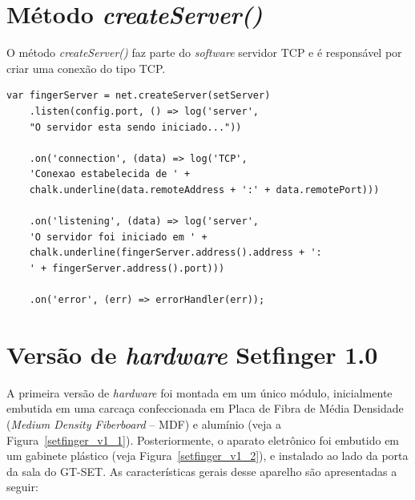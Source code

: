 \chapter{Método \textit{createServer()} \label{apendice_createserver}}
O método \textit{createServer()} faz parte do \textit{software} servidor TCP e é responsável por criar uma conexão do tipo TCP.

\begin{lstlisting}
var fingerServer = net.createServer(setServer)
    .listen(config.port, () => log('server', 
    "O servidor esta sendo iniciado..."))
    
    .on('connection', (data) => log('TCP', 
    'Conexao estabelecida de ' +
    chalk.underline(data.remoteAddress + ':' + data.remotePort)))
    
    .on('listening', (data) => log('server', 
    'O servidor foi iniciado em ' + 
    chalk.underline(fingerServer.address().address + ':
    ' + fingerServer.address().port)))
    
    .on('error', (err) => errorHandler(err));
\end{lstlisting}








\chapter{Versão de \textit{hardware} Setfinger 1.0\label{hardware_1.0}}



A primeira versão de \textit{hardware} foi montada em um único módulo, inicialmente embutida em uma carcaça confeccionada em Placa de Fibra de Média Densidade (\textit{Medium Density Fiberboard} -- MDF) e alumínio (veja a Figura~\ref{setfinger_v1_1}).
Posteriormente, o aparato eletrônico foi embutido em um gabinete plástico (veja Figura~\ref{setfinger_v1_2}), e instalado ao lado da porta da sala do GT-SET. As características gerais desse aparelho são apresentadas a seguir:


